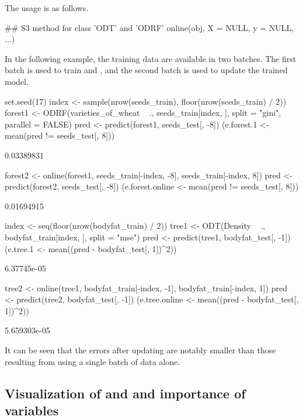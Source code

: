 The usage is as follows.
\begin{example}
## S3 method for class 'ODT' and 'ODRF'
online(obj, X = NULL, y = NULL, ...)
\end{example}
In the following example, the training data are available in two batches. The first batch is used to train  and , and the second batch is used to update the trained model. 
\begin{example}
set.seed(17)
index <- sample(nrow(seeds_train), floor(nrow(seeds_train) / 2))
forest1 <- ODRF(varieties_of_wheat ~ ., seeds_train[index, ], split = "gini", 
  parallel = FALSE)
pred <- predict(forest1, seeds_test[, -8])
(e.forest.1 <- mean(pred != seeds_test[, 8]))
\end{example}
\begin{example}
[1] 0.03389831
\end{example}
\begin{example}
forest2 <- online(forest1, seeds_train[-index, -8], seeds_train[-index, 8])
pred <- predict(forest2, seeds_test[, -8])
(e.forest.online <- mean(pred != seeds_test[, 8]))
\end{example}
\begin{example}
[1] 0.01694915
\end{example}
\begin{example}
index <- seq(floor(nrow(bodyfat_train) / 2))
tree1 <- ODT(Density ~ ., bodyfat_train[index, ], split = "mse")
pred <- predict(tree1, bodyfat_test[, -1])
(e.tree.1 <- mean((pred - bodyfat_test[, 1])^2))
\end{example}
\begin{example}
[1] 6.37745e-05
\end{example}
\begin{example}
tree2 <- online(tree1, bodyfat_train[-index, -1], bodyfat_train[-index, 1])
pred <- predict(tree2, bodyfat_test[, -1])
(e.tree.online <- mean((pred - bodyfat_test[, 1])^2))
\end{example}
\begin{example}
[1] 5.659303e-05
\end{example}
It can be seen that the errors after updating are notably smaller than  those resulting from using a single batch of data alone.

\subsection[Visualization of ODT and ODRF and importance of variables]{Visualization of  and  and importance of variables}

